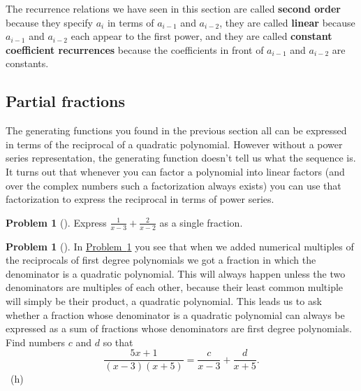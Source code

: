 \documentclass[10pt,]{book}
\newcommand{\terminology}[1]{\textbf{#1}}
\theoremstyle{plain}
\theoremstyle{definition}
\newtheorem{activity}[project]{Problem}
\theoremstyle{definition}
\numberwithin{equation}{chapter}
\begin{document}
\hypertarget{p-1243}{}%
The recurrence relations we have seen in this section are called \terminology{second order} because they specify \(a_i\) in terms of \(a_{i-1}\) and \(a_{i-2}\), they are called \terminology{linear} because \(a_{i-1}\) and \(a_{i-2}\) each appear to the first power, and they are called \terminology{constant coefficient recurrences} because the coefficients in front of \(a_{i-1}\) and \(a_{i-2}\) are constants.%
\typeout{************************************************}
\typeout{************************************************}
\subsection[{Partial fractions}]{Partial fractions}\label{subsection-49}
\hypertarget{p-1244}{}%
The generating functions you found in the previous section all can be expressed in terms of the reciprocal of a quadratic polynomial. However without a power series representation, the generating function doesn't tell us what the sequence is. It turns out that whenever you can factor a polynomial into linear factors (and over the complex numbers such a factorization always exists) you can use that factorization to express the reciprocal in terms of power series.%
\begin{activity}[] \label{simplifysumoffractions}
\hypertarget{p-1245}{}%
Express \(\frac{1}{x-3} + \frac{2}{x-2}\) as a single fraction.%
\end{activity}
\begin{activity}[] \label{partialfractionsintro}
\hypertarget{p-1247}{}%
In \hyperref[simplifysumoffractions]{Problem~\ref{simplifysumoffractions}} you see that when we added numerical multiples of the reciprocals of first degree polynomials we got a fraction in which the denominator is a quadratic polynomial. This will always happen unless the two denominators are multiples of each other, because their least common multiple will simply be their product, a quadratic polynomial. This leads us to ask whether a fraction whose denominator is a quadratic polynomial can always be expressed as a sum of fractions whose denominators are first degree polynomials. Find numbers \(c\) and \(d\) so that%
\begin{equation*}
\frac{5x+1}{(x-3)(x+5)} = \frac{c}{x-3} + \frac{d}{x+5}.
\end{equation*}
%
~{\tiny (h)}\end{activity}
\end{document}
